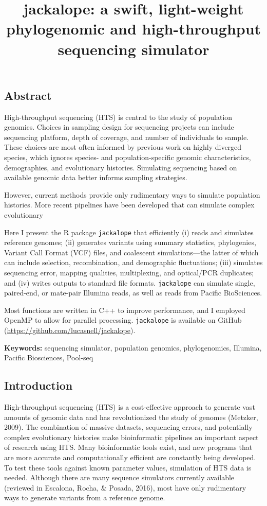 \documentclass[12pt,]{article}
\title{jackalope: a swift, light-weight phylogenomic and high-throughput sequencing simulator}
\author{}
\date{}
\begin{document}
\maketitle

\hypertarget{abstract}{%
\subsection{Abstract}\label{abstract}}

High-throughput sequencing (HTS) is central to the study of population genomics.
Choices in sampling design for sequencing projects can include
sequencing platform, depth of coverage, and number of individuals to sample.
These choices are most often informed by previous work on highly diverged species,
which ignores species- and population-specific genomic characteristics, demographies,
and evolutionary histories.
Simulating sequencing based on available genomic data better informs sampling
strategies.

However, current methods provide only rudimentary ways to simulate population
histories.
More recent pipelines have been developed that can simulate complex evolutionary

Here I present the R package \texttt{jackalope} that efficiently
(i) reads and simulates reference genomes;
(ii) generates variants using summary statistics, phylogenies,
Variant Call Format (VCF) files, and coalescent simulations---the latter of which can
include selection, recombination, and demographic fluctuations;
(iii) simulates sequencing error, mapping qualities, multiplexing, and
optical/PCR duplicates;
and
(iv) writes outputs to standard file formats.
\texttt{jackalope} can simulate single, paired-end, or mate-pair Illumina reads,
as well as reads from Pacific BioSciences.

Most functions are written in C++ to improve performance, and I employed OpenMP to
allow for parallel processing.
\texttt{jackalope} is available on GitHub
(\url{https://github.com/lucasnell/jackalope}).

\textbf{Keywords:} sequencing simulator, population genomics, phylogenomics,
Illumina, Pacific Biosciences, Pool-seq

\hypertarget{introduction}{%
\subsection{Introduction}\label{introduction}}

High-throughput sequencing (HTS) is a cost-effective approach to generate vast amounts
of genomic data and has revolutionized the study of genomes
(Metzker, 2009).
The combination of massive datasets, sequencing errors, and potentially complex
evolutionary histories make bioinformatic pipelines an important aspect of
research using HTS.
Many bioinformatic tools exist, and new programs that are more accurate and
computationally efficient are constantly being developed.
To test these tools against known parameter values, simulation of HTS data is needed.
Although there are many sequence simulators currently available
(reviewed in Escalona, Rocha, \& Posada, 2016),
most have only rudimentary ways to generate variants from a reference genome.
\end{document}
